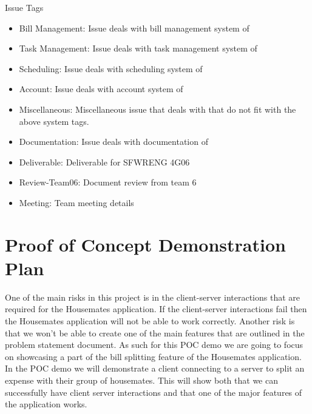 \documentclass{article}
\begin{document}
\noindent Issue Tags
\begin{itemize}
    \item Bill Management: Issue deals with bill management system of \progname{}
    \item Task Management: Issue deals with task management system of \progname{}
    \item Scheduling: Issue deals with scheduling system of \progname{}
    \item Account: Issue deals with account system of \progname{}
    \item Miscellaneous: Miscellaneous issue that deals with \progname{} that do not fit with the above system tags.
    \item Documentation: Issue deals with documentation of \progname{}
    \item Deliverable: Deliverable for SFWRENG 4G06
    \item Review-Team06: Document review from team 6
    \item Meeting: Team meeting details
\end{itemize}


    

    

\section{Proof of Concept Demonstration Plan}
    One of the main risks in this project is in the client-server interactions that are required for the Housemates application. If the client-server interactions fail then the Housemates application will not be able to work correctly. Another risk is that we won't be able to create one of the main features that are outlined in the problem statement document. As such for this POC demo we are going to focus on showcasing a part of the bill splitting feature of the Housemates application. In the POC demo we will demonstrate a client connecting to a server to split an expense with their group of housemates. This will show both that we can successfully have client server interactions and that one of the major features of the application works.
    
\end{document}
